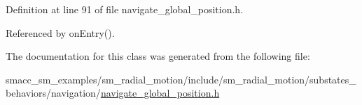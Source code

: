 Definition at line 91 of file navigate\+\_\+global\+\_\+position.\+h.



Referenced by on\+Entry().



The documentation for this class was generated from the following file\+:\begin{DoxyCompactItemize}
\item 
smacc\+\_\+sm\+\_\+examples/sm\+\_\+radial\+\_\+motion/include/sm\+\_\+radial\+\_\+motion/substates\+\_\+behaviors/navigation/\hyperlink{navigate__global__position_8h}{navigate\+\_\+global\+\_\+position.\+h}\end{DoxyCompactItemize}
